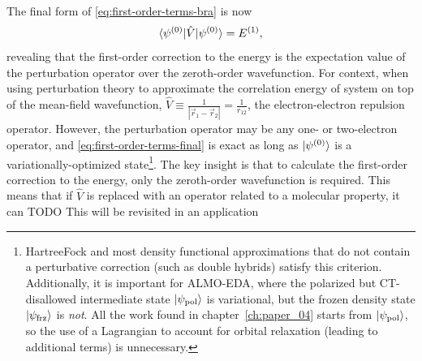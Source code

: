 \documentclass[%
class = book,%
crop = false,%
float = true,%
multi = true,%
preview = false,%
]{standalone}
\newcommand\hf{Hartree\textendash{}Fock\xspace}%
\begin{document}
The final form of \eqref{eq:first-order-terms-bra} is now
\begin{equation}
  \label{eq:first-order-terms-final}
  \braket{\psi^{(0)} | \hat{V} | \psi^{(0)}} = E^{(1)},
\end{equation}
revealing that the first-order correction to the energy is the expectation value of the perturbation operator over the zeroth-order wavefunction. For context, when using perturbation theory to approximate the correlation energy of system on top of the mean-field wavefunction, \(\hat{V} \equiv \frac{1}{|\vec{r}_{1} - \vec{r}_{2}|} = \frac{1}{r_{12}}\), the electron-electron repulsion operator. However, the perturbation operator may be any one- or two-electron operator, and \eqref{eq:first-order-terms-final} is exact as long as \(\ket{\psi^{(0)}}\) is a variationally-optimized state\footnote{\hf and most density functional approximations that do not contain a perturbative correction (such as double hybrids) satisfy this criterion. Additionally, it is important for ALMO-EDA, where the polarized but CT-disallowed intermediate state \(\ket{\psi_{\text{pol}}}\) is variational, but the frozen density state \(\ket{\psi_{\text{frz}}}\) is \emph{not}. All the work found in chapter~\ref{ch:paper_04} starts from \(\ket{\psi_{\text{pol}}}\), so the use of a Lagrangian to account for orbital relaxation (leading to additional terms) is unnecessary.}. The key insight is that to calculate the first-order correction to the energy, only the zeroth-order wavefunction is required. This means that if \(\hat{V}\) is replaced with an operator related to a molecular property, it can TODO This will be revisited in an application
\end{document}
